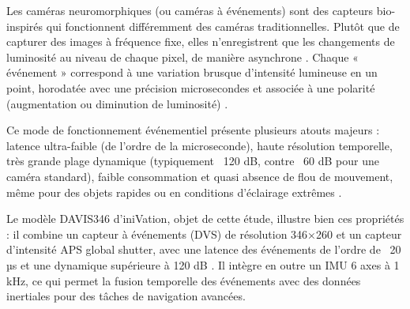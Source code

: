 Les caméras neuromorphiques (ou caméras à événements) sont des capteurs bio-inspirés qui fonctionnent différemment des caméras traditionnelles. Plutôt que de capturer des images à fréquence fixe, elles n'enregistrent que les changements de luminosité au niveau de chaque pixel, de manière asynchrone \cite{gallego2020event}. Chaque « événement » correspond à une variation brusque d'intensité lumineuse en un point, horodatée avec une précision microsecondes et associée à une polarité (augmentation ou diminution de luminosité) \cite{bugueno2025human}. 

Ce mode de fonctionnement événementiel présente plusieurs atouts majeurs : latence ultra-faible (de l'ordre de la microseconde), haute résolution temporelle, très grande plage dynamique (typiquement ~120 dB, contre ~60 dB pour une caméra standard), faible consommation et quasi absence de flou de mouvement, même pour des objets rapides ou en conditions d'éclairage extrêmes \cite{zhu2023overleaf, sanket2020evdodgenet}. 

Le modèle DAVIS346 d'iniVation, objet de cette étude, illustre bien ces propriétés : il combine un capteur à événements (DVS) de résolution 346×260 et un capteur d'intensité APS global shutter, avec une latence des événements de l'ordre de ~20 µs et une dynamique supérieure à 120 dB \cite{gallego2020event}. Il intègre en outre un IMU 6 axes à 1 kHz, ce qui permet la fusion temporelle des événements avec des données inertiales pour des tâches de navigation avancées.

